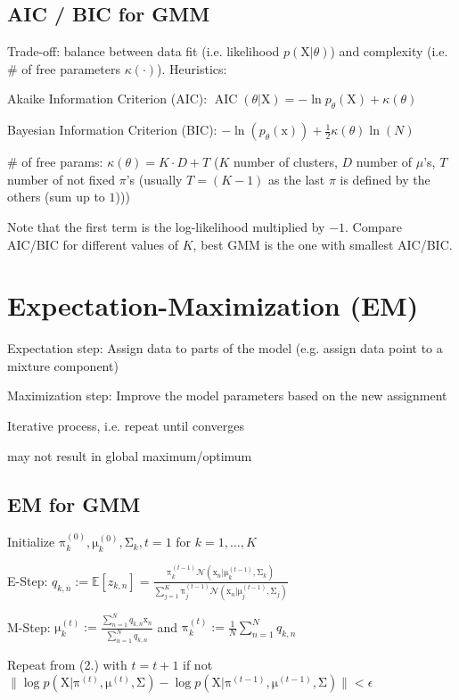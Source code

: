 \documentclass[a4paper, 11pt, landscape]{article}
\newcommand{\matr}[1]{\boldsymbol{\mathrm{#1}}}
\begin{document}
\begin{multicols*}{3}
\subsection{AIC / BIC for GMM}
Trade-off: balance between data fit (i.e. likelihood $p(\matr{X} | \theta)$) and complexity (i.e. \# of free parameters $\kappa(\cdot)$). Heuristics:
\begin{compactdesc}
	\item[Akaike Information Criterion (AIC):] $\operatorname{AIC}(\theta | \matr{X}) = -\ln p_\theta(\matr{X}) + \kappa(\theta)$
	\item[Bayesian Information Criterion (BIC):] $-\ln(p_\theta(\matr{x})) + \frac{1}{2} \kappa(\theta) \ln(N)$
	\item[\# of free params:] $\kappa(\theta) = K \cdot D + T$ ($K$ number of clusters, $D$ number of $\mu$'s, $T$ number of not fixed $\pi$'s (usually $T=(K-1)$ as the last $\pi$ is defined by the others (sum up to $1$)))
\end{compactdesc}
Note that the first term is the log-likelihood multiplied by $-1$. Compare AIC/BIC for different values of $K$, best GMM is the one with smallest AIC/BIC.


\section{Expectation-Maximization (EM)}
\begin{compactitem}
	\item Expectation step: Assign data to parts of the model (e.g. assign data point to a mixture component)
	\item Maximization step: Improve the model parameters based on the new assignment
	\item Iterative process, i.e. repeat until converges
	\item may not result in global maximum/optimum
\end{compactitem}

\subsection{EM for GMM}
\begin{compactenum}
	\item Initialize $\matr{\pi}_k^{(0)}, \matr{\mu}_k^{(0)}, \matr{\Sigma}_k, t = 1$ for $k = 1, \ldots, K$
	\item E-Step: $q_{k,n} := \mathbb{E}[z_{k,n}] = \frac{\matr{\pi}_k^{(t-1)} \mathcal{N}(\matr{x}_n | \matr{\mu}_k^{(t-1)}, \matr{\Sigma}_k)}{\sum_{j=1}^K \matr{\pi}_j^{(t-1)} \mathcal{N}(\matr{x}_n | \matr{\mu}_j^{(t-1)}, \matr{\Sigma}_j)}$
	\item M-Step: $\matr{\mu}_k^{(t)} := \frac{\sum_{n=1}^N q_{k,n} \matr{x}_n}{\sum_{n=1}^N q_{k,n}}$ and $\matr{\pi}_k^{(t)} := \frac{1}{N} \sum_{n=1}^N q_{k,n}$
	\item Repeat from (2.) with $t = t + 1$ if not $\| \log p(\matr{X} | \matr{\pi}^{(t)}, \matr{\mu}^{(t)}, \matr{\Sigma}) - \log p(\matr{X} | \matr{\pi}^{(t-1)}, \matr{\mu}^{(t-1)}, \matr{\Sigma}) \| < \epsilon$
\end{compactenum}



\end{multicols*}
\end{document}
